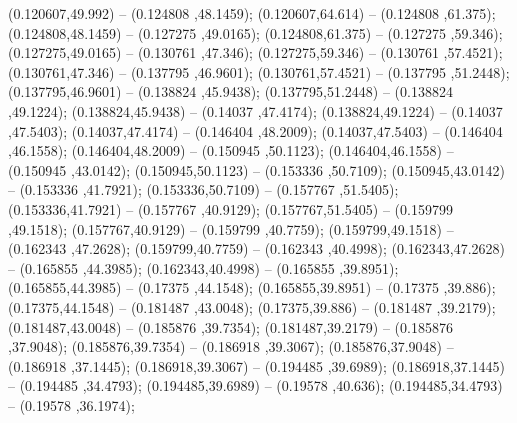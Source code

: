  (0.120607,49.992) -- (0.124808 ,48.1459);
 (0.120607,64.614) -- (0.124808 ,61.375);
 (0.124808,48.1459) -- (0.127275 ,49.0165);
 (0.124808,61.375) -- (0.127275 ,59.346);
 (0.127275,49.0165) -- (0.130761 ,47.346);
 (0.127275,59.346) -- (0.130761 ,57.4521);
 (0.130761,47.346) -- (0.137795 ,46.9601);
 (0.130761,57.4521) -- (0.137795 ,51.2448);
 (0.137795,46.9601) -- (0.138824 ,45.9438);
 (0.137795,51.2448) -- (0.138824 ,49.1224);
 (0.138824,45.9438) -- (0.14037 ,47.4174);
 (0.138824,49.1224) -- (0.14037 ,47.5403);
 (0.14037,47.4174) -- (0.146404 ,48.2009);
 (0.14037,47.5403) -- (0.146404 ,46.1558);
 (0.146404,48.2009) -- (0.150945 ,50.1123);
 (0.146404,46.1558) -- (0.150945 ,43.0142);
 (0.150945,50.1123) -- (0.153336 ,50.7109);
 (0.150945,43.0142) -- (0.153336 ,41.7921);
 (0.153336,50.7109) -- (0.157767 ,51.5405);
 (0.153336,41.7921) -- (0.157767 ,40.9129);
 (0.157767,51.5405) -- (0.159799 ,49.1518);
 (0.157767,40.9129) -- (0.159799 ,40.7759);
 (0.159799,49.1518) -- (0.162343 ,47.2628);
 (0.159799,40.7759) -- (0.162343 ,40.4998);
 (0.162343,47.2628) -- (0.165855 ,44.3985);
 (0.162343,40.4998) -- (0.165855 ,39.8951);
 (0.165855,44.3985) -- (0.17375 ,44.1548);
 (0.165855,39.8951) -- (0.17375 ,39.886);
 (0.17375,44.1548) -- (0.181487 ,43.0048);
 (0.17375,39.886) -- (0.181487 ,39.2179);
 (0.181487,43.0048) -- (0.185876 ,39.7354);
 (0.181487,39.2179) -- (0.185876 ,37.9048);
 (0.185876,39.7354) -- (0.186918 ,39.3067);
 (0.185876,37.9048) -- (0.186918 ,37.1445);
 (0.186918,39.3067) -- (0.194485 ,39.6989);
 (0.186918,37.1445) -- (0.194485 ,34.4793);
 (0.194485,39.6989) -- (0.19578 ,40.636);
 (0.194485,34.4793) -- (0.19578 ,36.1974);
